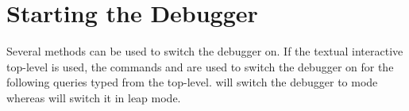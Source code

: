 %
%
%
%


\section{Starting the Debugger}

Several methods can be used to switch the debugger on.
If the textual interactive top-level is used, the commands
 and
 are used to
switch the debugger on for the following queries typed from the
top-level.
 will switch the
debugger to  mode whereas
 will switch it
in leap mode.

